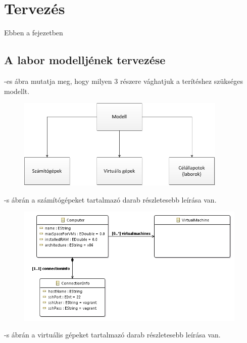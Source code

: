 \chapter{Tervezés}
\label{chp:design}
Ebben a fejezetben 



\section{A labor modelljének tervezése}
\label{design_model}

-es ábra mutatja meg, hogy milyen 3 részere vághatjuk a terítéshez szükséges modellt.

\begin{figure}[ht]
	\centering
	\includegraphics[width=100mm, keepaspectratio]{figures/design_modelparts.png}
	\caption{}
	\label{fig:designmodelparts}
\end{figure}

-s ábrán a számítógépeket tartalmazó darab részletesebb leírása van.

\begin{figure}[ht]
	\centering
	\includegraphics[width=110mm, keepaspectratio]{figures/design_computer.png}
	\caption{}
	\label{fig:designcomputers}
\end{figure}

-s ábrán a virtuális gépeket tartalmazó darab részletesebb leírása van.

